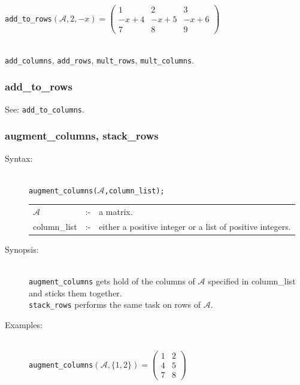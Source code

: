{\begin{description}
  \texttt{add\_to\_rows}\((\mathcal{A},2,-x)  =
  \begin{pmatrix} 1 & 2 & 3 \\ -x+4 & -x+5 & -x+6 \\ 7 & 8 & 9 \end{pmatrix}\)

\item[Related functions:]\mbox{}\\
\texttt{add\_columns}, \texttt{add\_rows}, \texttt{mult\_rows},
\texttt{mult\_columns}.
\end{description}

\subsubsection{add\_to\_rows}
\label{linalg:add_to_rows}
\hypertarget{operator:ADD_TO_ROWS}{}

See: \texttt{add\_to\_columns}.


\subsubsection{augment\_columns, stack\_rows}
\label{linalg:augment_columns}
\hypertarget{operator:AUGMENT_COLUMNS}{}

\begin{description}
\item[Syntax:]\mbox{}\\
{\tt augment\_columns($\mathcal{A}$,column\_list);}\\[2mm]
\begin{tabular}{l l l}
$\mathcal{A}$  &:-& a matrix. \\
column\_list &:-&  either a positive integer or a list of positive
                   integers.
\end{tabular}

\item[Synopsis:]\mbox{}\\
\texttt{augment\_columns} gets hold of the columns of $\mathcal{A}$ specified
in column\_list and sticks them together. \\
\texttt{stack\_rows} performs the same task on rows of
                $\mathcal{A}$.

\item[Examples:]\mbox{}\\
  \texttt{augment\_columns}\((\mathcal{A},\{1,2\})  =
  \begin{pmatrix} 1 & 2 \\ 4 & 5 \\ 7 & 8  \end{pmatrix}\)


\end{description}}

